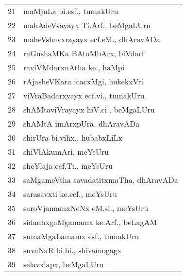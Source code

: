 {\begin{longtable}{rl}
21 & maMjuLa bi.esf., tumakUru\\
22 & mahAdeVvayayx Ti.Arf., beMgaLUru\\
23 & maheVshavxrayayx ecf.eM., dhAravADa\\
24 & raGushaMKa BAtaMbArx, biVdarf\\
25 & raviVMdarxnAtha ke., haMpi\\
26 & rAjasheVKara icacxMgi, hukekxVri\\
27 & viVraBadarxyayx ecf.vi., tumakUru\\
28 & shAMtaviVrayayx hiV.ci., beMgaLUru\\
29 & shAMtA imArxpUra, dhAravADa\\
30 & shirUra bi.vihx., hubabxLiLx\\
31 & shiVlAkumAri, meYsUru\\
32 & sheYlaja ecf.Ti., meYsUru\\
33 & saMgameVsha savadatitxmaTha, dhAravADa\\
34 & sarasavxti ke.ecf., meYsUru\\
35 & saroVjamamxNeNx eM.si., meYsUru\\
36 & sidadhxgaMgamamx ke.Arf., beLagAM\\
37 & sumaMgaLamamx esf., tumakUru\\
38 & suvaNaR bi.bi., shivamogagx\\
39 &  selavxlapx, beMgaLUru\\
\end{longtable}}
